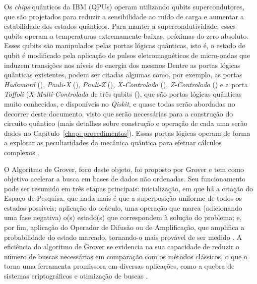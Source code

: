 Os \textit{chips} qu\^{a}nticos da IBM (QPUs) operam utilizando qubits supercondutores, que s\~{a}o projetados para reduzir a sensibilidade ao ruído de carga e aumentar a estabilidade dos estados qu\^{a}nticos. Para manter a supercondutividade, esses qubits operam a temperaturas extremamente baixas, próximas do zero absoluto. Esses qubits s\~{a}o manipulados pelas portas lógicas qu\^{a}nticas, isto \'{e}, o estado de qubit \'{e} modificado pela aplicaç\~{a}o de pulsos eletromagn\'{e}ticos de micro-ondas que induzem transições nos níveis de energia dos mesmos \cite{EITCA2024_CQ}
Dentre as portas lógicas qu\^{a}nticas existentes, podem ser citadas algumas como, por exemplo, as portas \emph{Hadamard} (), \emph{Pauli-X} (), \emph{Pauli-Z} (), \emph{X-Controlada} (), \emph{Z-Controlada} () e a porta  \emph{Toffoli} (\emph{X-Multi-Controlada} de tr\^{e}s qubits (), que s\~{a}o portas lógicas qu\^{a}nticas muito conhecidas, e disponíveis no \emph{Qiskit}, e quase todas ser\~{a}o abordadas no decorrer deste documento, visto que ser\~{a}o necess\'{a}rias para a construç\~{a}o do circuito qu\^{a}ntico (mais detalhes sobre construç\~{a}o e operaç\~{a}o de cada uma ser\~{a}o dados no Cap\'{i}tulo~\ref{chap: procedimentos}). Essas portas lógicas operam de forma a explorar as peculiaridades da mec\^{a}nica qu\^{a}ntica para efetuar c\'{a}lculos complexos \cite{Nielsen_Chuang2010_Livro}.

O Algoritmo de Grover, foco deste objeto, foi proposto por Grover \citeyear{grover1996} e tem como objetivo acelerar a busca em bases de dados n\~{a}o ordenadas. Seu funcionamento pode ser resumido em tr\^{e}s etapas principais: inicializaç\~{a}o, em que h\'{a} a criaç\~{a}o do Espaço de Pesquisa, que nada mais \'{e} que a superposiç\~{a}o uniforme de todos os estados possíveis; aplicaç\~{a}o do or\'{a}culo, uma operaç\~{a}o que marca (adicionando uma fase negativa) o(s) estado(s) que correspondem à soluç\~{a}o do problema; e, por fim, aplicaç\~{a}o do Operador de Difus\~{a}o ou de Amplificaç\~{a}o, que amplifica a probabilidade do estado marcado, tornando-o mais prov\'{a}vel de ser medido \cite{qiskit_GroverNotebook}. A efici\^{e}ncia do algoritmo de Grover se evidencia na sua capacidade de reduzir o número de buscas necess\'{a}rias em comparaç\~{a}o com os m\'{e}todos cl\'{a}ssicos, o que o torna uma ferramenta promissora em diversas aplicações, como a quebra de sistemas criptogr\'{a}ficos e otimizaç\~{a}o de buscas \cite{grover1996}.

